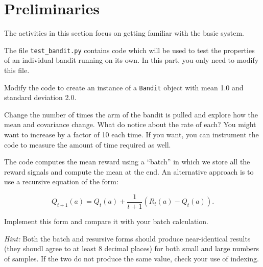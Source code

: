 \documentclass[twoside]{ucl_exam}
\begin{document}
\section*{Preliminaries}

The activities in this section focus on getting familiar with the basic system.

\begin{question}

The file \texttt{test\_bandit.py} contains code which will be used to test the
properties of an individual bandit running on its own. In this part, you only
need to modify this file.

\begin{subquestion}

Modify the code to create an instance of a \texttt{Bandit} object with mean 1.0
and standard deviation 2.0.

\end{subquestion}

\begin{subquestion}

Change the number of times the arm of the bandit is pulled and explore how the
mean and covariance change. What do notice about the rate of each? You might
want to increase by a factor of 10 each time. If you want, you can instrument
the code to measure the amount of time required as well.

\end{subquestion}

\begin{subquestion}

The code computes the mean reward using a ``batch'' in which we store all the
reward signals and compute the mean at the end. An alternative approach is to
use a recursive equation of the form:

\begin{equation*}
Q_{t+1}(a)=Q_t(a)+\frac{1}{t+1}\left(R_t(a)-Q_t(a)\right).
\end{equation*}

Implement this form and compare it with your batch calculation.

\emph{Hint:\/} Both the batch and resursive forms should produce near-identical
results (they shoudl agree to at least 8 decimal places) for both small and large
numbers of samples. If the two do not produce the same value, check your use of
indexing.

\end{subquestion}

\end{question}
\end{document}
